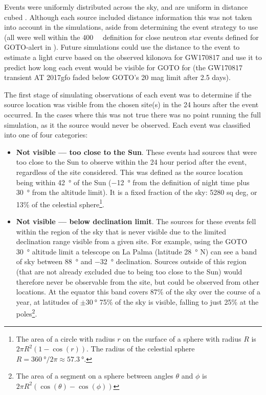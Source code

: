 \begin{colsection}
Events were uniformly distributed across the sky, and are uniform in distance cubed \citep{First2Years}. Although each source included distance information this was not taken into account in the simulations, aside from determining the event strategy to use (all were well within the \SI{400}{\mega\parsec} definition for close neutron star events defined for GOTO-alert in ). Future simulations could use the distance to the event to estimate a light curve based on the observed kilonova for GW170817 \citep{GW170817_followup} and use it to predict how long each event would be visible for GOTO for (the GW170817 transient AT 2017gfo faded below GOTO's 20 mag limit after 2.5 days).

\newpage

The first stage of simulating observations of each event was to determine if the source location was visible from the chosen site(s) in the 24 hours after the event occurred. In the cases where this was not true there was no point running the full simulation, as it the source would never be observed. Each event was classified into one of four categories: %

\begin{itemize}
    \item \textbf{Not visible --- too close to the Sun}. These events had sources that were too close to the Sun to observe within the 24 hour period after the event, regardless of the site considered. This was defined as the source location being within \SI{42}{\degree} of the Sun (\SI{-12}{\degree} from the definition of night time plus \SI{30}{\degree} from the altitude limit). It is a fixed fraction of the sky: 5280 sq deg, or 13\% of the celestial sphere\footnote{The area of a circle with radius $r$ on the surface of a sphere with radius $R$ is $2\pi R^2(1-\cos(r))$. The radius of the celestial sphere $R=\SI{360}{\degree}/2\pi \approx \SI{57.3}{\degree}$.}.

    \item \textbf{Not visible --- below declination limit}. The sources for these events fell within the region of the sky that is never visible due to the limited declination range visible from a given site. For example, using the GOTO \SI{30}{\degree} altitude limit a telescope on La Palma (latitude \SI{28}{\degree} N) can see a band of sky between \SI{+88}{\degree} and \SI{-32}{\degree} declination. Sources outside of this region (that are not already excluded due to being too close to the Sun) would therefore never be observable from the site, but could be observed from other locations. At the equator this band covers 87\% of the sky over the course of a year, at latitudes of $\pm \SI{30}{\degree}$ 75\% of the sky is visible, falling to just 25\% at the poles\footnote{The area of a segment on a sphere between angles $\theta$ and $\phi$ is $2 \pi R^2 (\cos(\theta)-\cos(\phi))$}.


\end{itemize}
\end{colsection}
